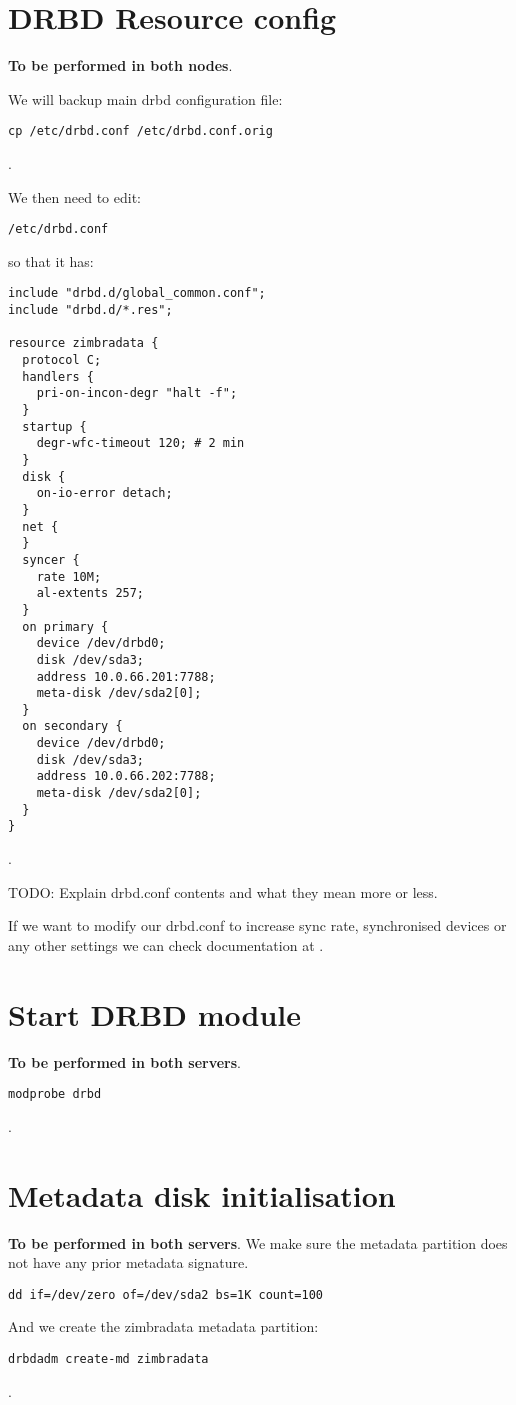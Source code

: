 \section {DRBD Resource config}
\textbf{To be performed in both nodes}.

We will backup main drbd configuration file:
\begin{verbatim}
cp /etc/drbd.conf /etc/drbd.conf.orig
\end{verbatim}
.

We then need to edit:
\begin{verbatim}
/etc/drbd.conf
\end{verbatim}
so that it has:
\begin{verbatim}
include "drbd.d/global_common.conf";
include "drbd.d/*.res";

resource zimbradata {
  protocol C;
  handlers {
    pri-on-incon-degr "halt -f";
  }
  startup {
    degr-wfc-timeout 120; # 2 min
  }
  disk {
    on-io-error detach;
  }
  net {
  }
  syncer {
    rate 10M;
    al-extents 257;
  }
  on primary {
    device /dev/drbd0;
    disk /dev/sda3;
    address 10.0.66.201:7788;
    meta-disk /dev/sda2[0];
  }
  on secondary {
    device /dev/drbd0;
    disk /dev/sda3;
    address 10.0.66.202:7788;
    meta-disk /dev/sda2[0];
  }
}
\end{verbatim}
.

TODO: Explain drbd.conf contents and what they mean more or less.

If we want to modify our drbd.conf to increase sync rate, synchronised devices or any other settings we can check documentation at \cite{LinbitDRBDdrbdconf}.

\section {Start DRBD module}
\textbf{To be performed in both servers}.
\begin{verbatim}
modprobe drbd
\end{verbatim}
.
\section {Metadata disk initialisation}
\textbf{To be performed in both servers}.
We make sure the metadata partition does not have any prior metadata signature.
\begin{verbatim}
dd if=/dev/zero of=/dev/sda2 bs=1K count=100
\end{verbatim}
And we create the zimbradata metadata partition:
\begin{verbatim}
drbdadm create-md zimbradata
\end{verbatim}
.

